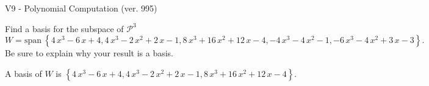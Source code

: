 \begin{exercise}
  \begin{exerciseTitle}V9 - Polynomial Computation (ver. 995)\end{exerciseTitle}
  \begin{exerciseStatement}
    Find a basis for the subspace of \(\mathcal{P}^3\) 
\[W=\mathrm{span}\ \left\{4 \, x^{3} - 6 \, x + 4 , 4 \, x^{3} - 2 \, x^{2} + 2 \, x - 1 , 8 \, x^{3} + 16 \, x^{2} + 12 \, x - 4 , -4 \, x^{3} - 4 \, x^{2} - 1 , -6 \, x^{3} - 4 \, x^{2} + 3 \, x - 3\right\}.\]
 Be sure to explain why your result is a basis.


  \end{exerciseStatement}
  \begin{exerciseAnswer}
   A basis of \(W\) is  \(\left\{4 \, x^{3} - 6 \, x + 4 , 4 \, x^{3} - 2 \, x^{2} + 2 \, x - 1 , 8 \, x^{3} + 16 \, x^{2} + 12 \, x - 4\right\}\).
  


  \end{exerciseAnswer}
\end{exercise}